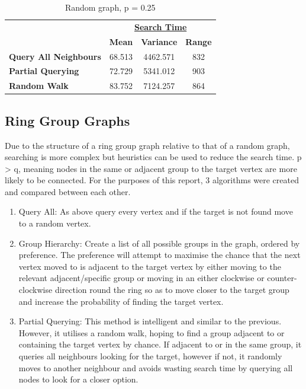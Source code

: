 \documentclass[12pt,a4paper]{article}
\begin{document}
\begin{table}[h]
	\centering
	\begin{tabular}{lccc}
		& \multicolumn{3}{c}{{\ul \textbf{Search Time}}}                                                                    \\ \cline{2-4} 
		\multicolumn{1}{l|}{}                               & \multicolumn{1}{c|}{\textbf{Mean}} & \multicolumn{1}{c|}{\textbf{Variance}} & \multicolumn{1}{c|}{\textbf{Range}} \\ \hline
		\multicolumn{1}{|l|}{\textbf{Query All Neighbours}} & \multicolumn{1}{c|}{68.513}        & \multicolumn{1}{c|}{4462.571}          & \multicolumn{1}{c|}{832}            \\ \hline
		\multicolumn{1}{|l|}{\textbf{Partial Querying}}     & \multicolumn{1}{c|}{72.729}        & \multicolumn{1}{c|}{5341.012}          & \multicolumn{1}{c|}{903}            \\ \hline
		\multicolumn{1}{|l|}{\textbf{Random Walk}}          & \multicolumn{1}{c|}{83.752}        & \multicolumn{1}{c|}{7124.257}          & \multicolumn{1}{c|}{864}            \\ \hline
	\end{tabular}
	\caption{Random graph, p = 0.25}
\end{table}

\newpage
\subsection{Ring Group Graphs}
Due to the structure of a ring group graph relative to that of a random graph, searching is more complex but heuristics can be used to reduce the search time. p > q, meaning nodes in the same or adjacent group to the target vertex are more likely to be connected. For the purposes of this report, 3 algorithms were created and compared between each other.

\vspace{10mm}

\begin{enumerate}
	\item Query All: As above query every vertex and if the target is not found move to a random vertex.
	\item Group Hierarchy: Create a list of all possible groups in the graph, ordered by preference. The preference will attempt to maximise the chance that the next vertex moved to is adjacent to the target vertex by either moving to the relevant adjacent/specific group or moving in an either clockwise or counter-clockwise direction round the ring so as to move closer to the target group and increase the probability of finding the target vertex.  
	\item Partial Querying: This method is intelligent and similar to the previous. However, it utilises a random walk, hoping to find a group adjacent to or containing the target vertex by chance. If adjacent to or in the same group, it queries all neighbours looking for the target, however if not, it randomly moves to another neighbour and avoids wasting search time by querying all nodes to look for a closer option.
\end{enumerate}
\end{document}
